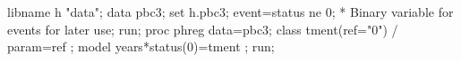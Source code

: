 \documentclass[
  letterpaper,
  DIV=11,
  numbers=noendperiod]{scrreprt}
\newenvironment{Shaded}{\begin{snugshade}}{\end{snugshade}}
\newcommand{\AttributeTok}[1]{\textcolor[rgb]{0.40,0.45,0.13}{#1}}
\newcommand{\ControlFlowTok}[1]{\textcolor[rgb]{0.00,0.23,0.31}{#1}}
\newcommand{\DecValTok}[1]{\textcolor[rgb]{0.68,0.00,0.00}{#1}}
\newcommand{\FunctionTok}[1]{\textcolor[rgb]{0.28,0.35,0.67}{#1}}
\newcommand{\NormalTok}[1]{\textcolor[rgb]{0.00,0.23,0.31}{#1}}
\newcommand{\OtherTok}[1]{\textcolor[rgb]{0.00,0.23,0.31}{#1}}
\newcommand{\SpecialCharTok}[1]{\textcolor[rgb]{0.37,0.37,0.37}{#1}}
\newcommand{\StringTok}[1]{\textcolor[rgb]{0.13,0.47,0.30}{#1}}
\begin{document}

\begin{Shaded}
\begin{Highlighting}[]
\NormalTok{libname h }\StringTok{"data"}\NormalTok{;}
\NormalTok{data pbc3;}
\NormalTok{  set h.pbc3;}
\NormalTok{  event}\OtherTok{=}\NormalTok{status ne }\DecValTok{0}\NormalTok{; }\SpecialCharTok{*}\NormalTok{ Binary variable }\ControlFlowTok{for}\NormalTok{ events }\ControlFlowTok{for}\NormalTok{ later use;}
\NormalTok{run;}
\NormalTok{proc phreg data}\OtherTok{=}\NormalTok{pbc3;}
\NormalTok{  class }\FunctionTok{tment}\NormalTok{(}\AttributeTok{ref=}\StringTok{"0"}\NormalTok{) }\SpecialCharTok{/}\NormalTok{ param}\OtherTok{=}\NormalTok{ref ;}
\NormalTok{  model years}\SpecialCharTok{*}\FunctionTok{status}\NormalTok{(}\DecValTok{0}\NormalTok{)}\OtherTok{=}\NormalTok{tment  ;}
\NormalTok{run;}
\end{Highlighting}
\end{Shaded}
\end{document}

